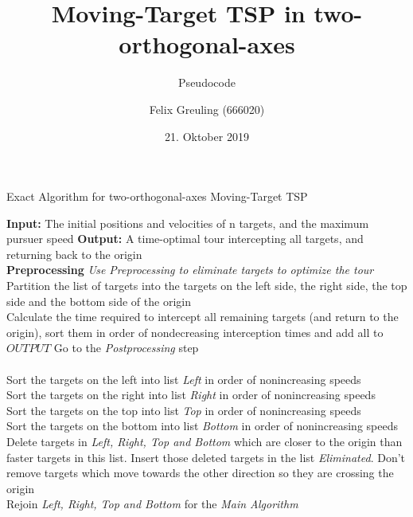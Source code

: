 \documentclass{scrartcl}
\title{Moving-Target TSP in two-orthogonal-axes}
\subtitle{Pseudocode}
\author{Felix Greuling (666020)}
\date{21. Oktober 2019}
\begin{document}
\maketitle


\begin{minipage}{1\linewidth}
\begin{algorithm}[H]
\caption{Exact Algorithm for two-orthogonal-axes Moving-Target TSP}
\begin{algorithmic}
\State \textbf{Input:} The initial positions and velocities of n targets, and the maximum pursuer speed
\State \textbf{Output:} A time-optimal tour intercepting all targets, and returning back to the origin \\
\State \textbf{Preprocessing}
\State \emph{Use Preprocessing to eliminate targets to optimize the tour}
\State Partition the list of targets into the targets on the left side, the right side, the top side and the bottom side of the origin\\
\State Calculate the time required to intercept all remaining targets (and return 
\State to the origin), sort them in order of nondecreasing interception times and 
\State add all to $OUTPUT$
\State Go to the \emph{Postprocessing} step
\EndIf 
\\\\
Sort the targets on the left into list \emph{Left} in order of nonincreasing speeds \\
Sort the targets on the right into list \emph{Right} in order of nonincreasing speeds \\
Sort the targets on the top into list \emph{Top} in order of nonincreasing speeds \\
Sort the targets on the bottom into list \emph{Bottom} in order of nonincreasing speeds \\

\State Delete targets in \emph{Left, Right, Top and Bottom} which are closer to the origin than faster targets in this list. Insert those deleted targets in the list \emph{Eliminated}. Don't remove targets which move towards the other direction so they are crossing the origin\\

\State Rejoin \emph{Left, Right, Top and Bottom} for the \emph{Main Algorithm}
\end{algorithmic}
\end{algorithm}
\end{minipage}
\end{document}
